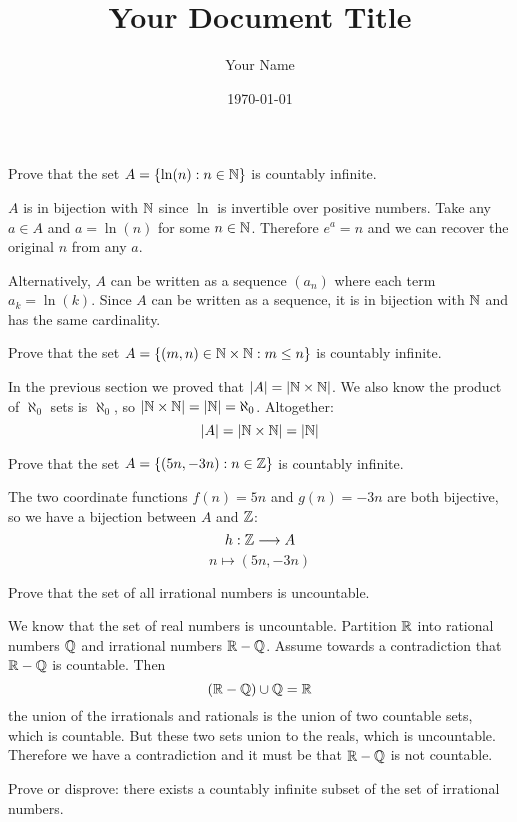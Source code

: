 \documentclass{article}
\title{Your Document Title}
\author{Your Name}
\date{\today} %
\begin{document}
\maketitle

\begin{problem}
Prove that the set $A = \{\ln(n): n \in \mathbb{N}\}$ is countably infinite.
\end{problem}

$A$ is in bijection with $\mathbb{N}$ since $\ln$ is invertible over positive numbers. Take any $a \in A$ and $a = \ln(n)$ for some $n \in \mathbb{N}$. Therefore $e^a = n$ and we can recover the original $n$ from any $a$.

Alternatively, $A$ can be written as a sequence $(a_n)$ where each term $a_k = \ln(k)$. Since $A$ can be written as a sequence, it is in bijection with $\mathbb{N}$ and has the same cardinality.

\begin{problem}
Prove that the set $A = \{(m, n) \in \mathbb{N} \times \mathbb{N}: m \leq n\}$ is countably infinite.
\end{problem}

In the previous section we proved that $|A| = |\mathbb{N} \times \mathbb{N}|$. We also know the product of $\aleph_0$ sets is $\aleph_0$, so $|\mathbb{N} \times \mathbb{N}| = |\mathbb{N}| = \aleph_0$. Altogether:
$$|A| = |\mathbb{N} \times \mathbb{N}| = |\mathbb{N}|$$

\begin{problem}
Prove that the set $A = \{(5n, -3n): n \in \mathbb{Z}\}$ is countably infinite.
\end{problem}

The two coordinate functions $f(n) = 5n$ and $g(n) = -3n$ are both bijective, so we have a bijection between $A$ and $\mathbb{Z}$:
$$h: \mathbb{Z} \longrightarrow A$$
$$n \longmapsto (5n, -3n)$$

\begin{problem}
Prove that the set of all irrational numbers is uncountable.
\end{problem}

We know that the set of real numbers is uncountable. Partition $\mathbb{R}$ into rational numbers $\mathbb{Q}$ and irrational numbers $\mathbb{R} - \mathbb{Q}$. Assume towards a contradiction that $\mathbb{R} - \mathbb{Q}$ is countable. Then
$$(\mathbb{R} - \mathbb{Q}) \cup \mathbb{Q} = \mathbb{R}$$
the union of the irrationals and rationals is the union of two countable sets, which is countable. But these two sets union to the reals, which is uncountable. Therefore we have a contradiction and it must be that $\mathbb{R} - \mathbb{Q}$ is not countable.

\begin{problem}
Prove or disprove: there exists a countably infinite subset of the set of irrational numbers.
\end{problem}
\end{document}
